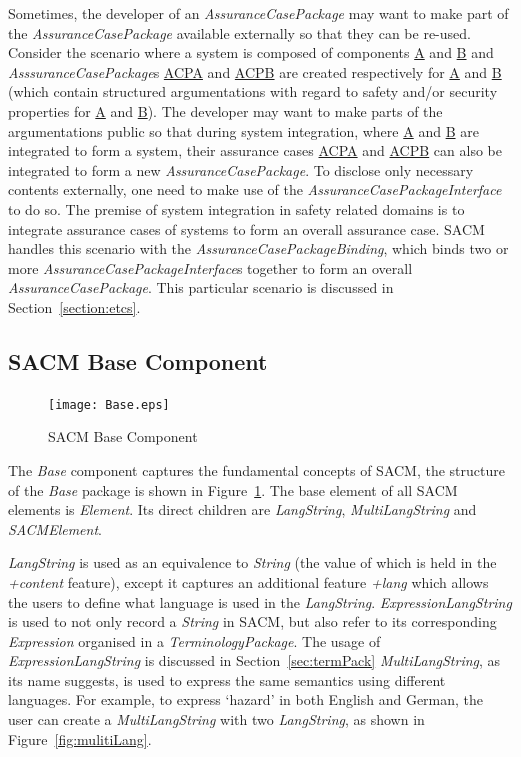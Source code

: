 Sometimes, the developer of an \textit{AssuranceCasePackage} may want to make part of the \textit{AssuranceCasePackage} available externally so that they can be re-used. 
Consider the scenario where a system is composed of components \underline{A} and \underline{B} and \textit{AsssuranceCasePackage}s \underline{ACPA} and \underline{ACPB} are created respectively for \underline{A} and \underline{B} (which contain structured argumentations with regard to safety and/or security properties for \underline{A} and \underline{B}). 
The developer may want to make parts of the argumentations public so that during system integration, where \underline{A} and \underline{B} are integrated to form a system, their assurance cases \underline{ACPA} and \underline{ACPB} can also be integrated to form a new \textit{AssuranceCasePackage}. 
To disclose only necessary contents externally, one need to make use of the \textit{AssuranceCasePackageInterface} to do so. 
The premise of system integration in safety related domains is to integrate assurance cases of systems to form an overall assurance case. SACM handles this scenario with the \textit{AssuranceCasePackageBinding}, which binds two or more \textit{AssuranceCasePackageInterface}s together to form an overall \textit{AssuranceCasePackage}. This particular scenario is discussed in Section~\ref{section:etcs}.

\subsection{SACM Base Component}
\label{sec:basePack}
\begin{figure}[ht!]
	\centering
	\texttt{[image: Base.eps]}
	\caption{SACM Base Component}
	\label{fig:base}
\end{figure}
The \textit{Base} component captures the fundamental concepts of SACM, the structure of the \textit{Base} package is shown in Figure~\ref{fig:base}. 
The base element of all SACM elements is \textit{Element}. 
Its direct children are \textit{LangString}, \textit{MultiLangString} and \textit{SACMElement}.

\textit{LangString} is used as an equivalence to \textit{String} (the value of which is held in the \textit{+content} feature), except it captures an additional feature \textit{+lang} which allows the users to define what language is used in the \textit{LangString}. 
\textit{ExpressionLangString} is used to not only record a \textit{String} in SACM, but also refer to its corresponding \textit{Expression} organised in a \textit{TerminologyPackage}. 
The usage of \textit{ExpressionLangString} is discussed in Section~\ref{sec:termPack} \textit{MultiLangString}, as its name suggests, is used to express the same semantics using different languages. 
For example, to express `hazard' in both English and German, the user can create a \textit{MultiLangString} with two \textit{LangString}, as shown in Figure~\ref{fig:mulitiLang}.

